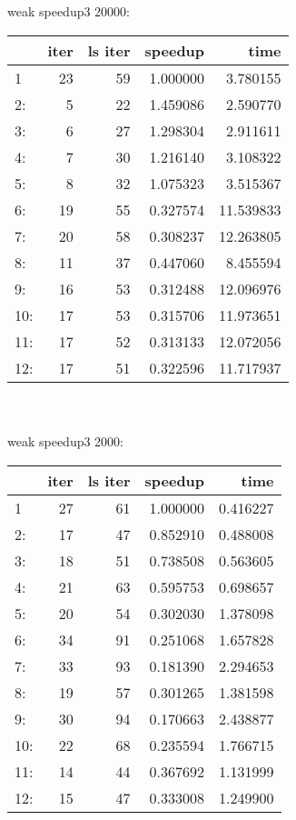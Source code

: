\documentclass[11pt,a4paper]{article}
\begin{document}
\\ 
\\ 
 weak speedup3 20000:
\\ 
\begin{tabular}{lrrrr}
\toprule
{} &  iter &  ls iter &   speedup &       time \\
\midrule
1   &    23 &       59 &  1.000000 &   3.780155 \\
2:  &     5 &       22 &  1.459086 &   2.590770 \\
3:  &     6 &       27 &  1.298304 &   2.911611 \\
4:  &     7 &       30 &  1.216140 &   3.108322 \\
5:  &     8 &       32 &  1.075323 &   3.515367 \\
6:  &    19 &       55 &  0.327574 &  11.539833 \\
7:  &    20 &       58 &  0.308237 &  12.263805 \\
8:  &    11 &       37 &  0.447060 &   8.455594 \\
9:  &    16 &       53 &  0.312488 &  12.096976 \\
10: &    17 &       53 &  0.315706 &  11.973651 \\
11: &    17 &       52 &  0.313133 &  12.072056 \\
12: &    17 &       51 &  0.322596 &  11.717937 \\
\bottomrule
\end{tabular}
\\ 
\\ 
 weak speedup3 2000:
\\ 
\begin{tabular}{lrrrr}
\toprule
{} &  iter &  ls iter &   speedup &      time \\
\midrule
1   &    27 &       61 &  1.000000 &  0.416227 \\
2:  &    17 &       47 &  0.852910 &  0.488008 \\
3:  &    18 &       51 &  0.738508 &  0.563605 \\
4:  &    21 &       63 &  0.595753 &  0.698657 \\
5:  &    20 &       54 &  0.302030 &  1.378098 \\
6:  &    34 &       91 &  0.251068 &  1.657828 \\
7:  &    33 &       93 &  0.181390 &  2.294653 \\
8:  &    19 &       57 &  0.301265 &  1.381598 \\
9:  &    30 &       94 &  0.170663 &  2.438877 \\
10: &    22 &       68 &  0.235594 &  1.766715 \\
11: &    14 &       44 &  0.367692 &  1.131999 \\
12: &    15 &       47 &  0.333008 &  1.249900 \\
\bottomrule
\end{tabular}
\end{document}
